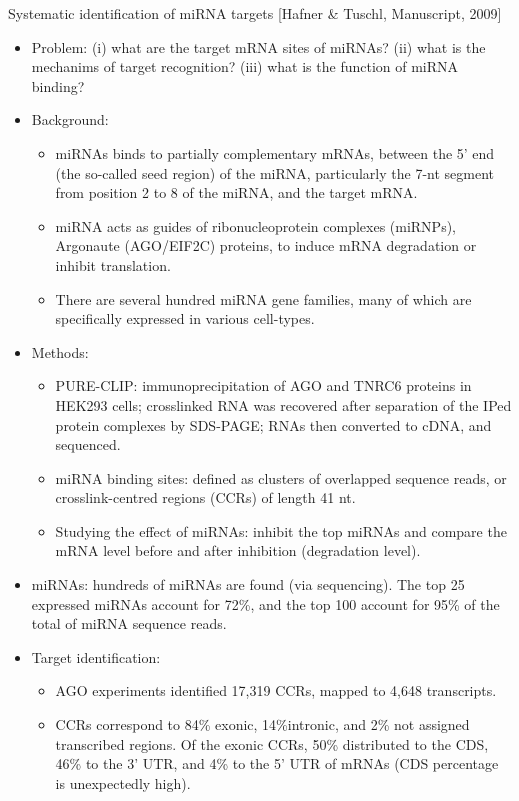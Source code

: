 \documentclass{report}
\begin{document}
Systematic identification of miRNA targets [Hafner \& Tuschl, Manuscript, 2009]
\begin{itemize}
	\item Problem: (i) what are the target mRNA sites of miRNAs? (ii) what is the mechanims of target recognition? (iii) what is the function of miRNA binding? 
	
	\item Background: 
	\begin{itemize}
		\item miRNAs binds to partially complementary mRNAs, between the 5' end (the so-called seed region) of the miRNA, particularly the 7-nt segment from position 2 to 8 of the miRNA, and the target mRNA. 
		
		\item miRNA acts as guides of ribonucleoprotein complexes (miRNPs), Argonaute (AGO/EIF2C) proteins, to induce mRNA degradation or inhibit translation.
		
		\item There are several hundred miRNA gene families, many of which are specifically expressed in various cell-types. 
	\end{itemize}
	
	\item Methods: 
	\begin{itemize}
		\item PURE-CLIP: immunoprecipitation of AGO and TNRC6 proteins in HEK293 cells; crosslinked RNA was recovered after separation of the IPed protein complexes by SDS-PAGE; RNAs then converted to cDNA, and sequenced. 
		\item miRNA binding sites: defined as clusters of overlapped sequence reads, or crosslink-centred regions (CCRs) of length 41 nt.
		\item Studying the effect of miRNAs: inhibit the top miRNAs and compare the mRNA level before and after inhibition (degradation level). 
	\end{itemize}
	
	\item miRNAs: hundreds of miRNAs are found (via sequencing). The top 25 expressed miRNAs account for 72\%, and the top 100 account for 95\% of the total of miRNA sequence reads. 
	
	\item Target identification: 
	\begin{itemize}
		\item AGO experiments identified 17,319 CCRs, mapped to 4,648 transcripts. 
		\item CCRs correspond to 84\% exonic, 14\%intronic, and 2\% not assigned transcribed regions. Of the exonic CCRs, 50\% distributed to the CDS, 46\% to the 3' UTR, and 4\% to the 5' UTR of mRNAs (CDS percentage is unexpectedly high). 
	\end{itemize}
	

\end{itemize}
\end{document}

